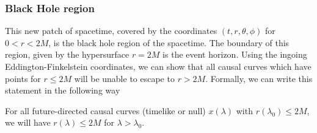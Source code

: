 \subsubsection{Black Hole region}

This new patch of spacetime, covered by the coordinates $(t,r,\theta,\phi)$ for $0 < r < 2M$, is the black hole region of the spacetime. The boundary of this region, given by the hypersurface $r = 2M$ is the event horizon. Using the ingoing Eddington-Finkelstein coordinates, we can show that all causal curves which have points for $r \leq 2M$ will be unable to escape to $r > 2M$. Formally, we can write this statement in the following way

\begin{prop}
For all future-directed causal curves (timelike or null) $x(\lambda)$ with $r(\lambda_0) \leq 2M$, we will have $r(\lambda) \leq 2M$ for $\lambda > \lambda_0$.
\end{prop}

